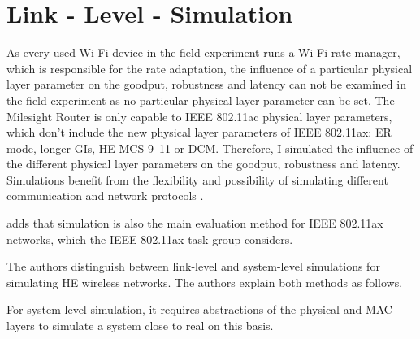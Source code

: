 \documentclass[]{nsm-thesis}
\begin{document}
\begin{comment}
\chapter{Developed architecture / System design / Implementation / ...}

\begin{itemize}
\item describe everything you yourself did (as opposed to the fundamentals chapter, which explains what you built on)
\item start with a theoretical approach
\item describe the developed system/algorithm/method from a high-level point of view
\item go ahead in presenting your developments in more detail
\item recommended length: approximately one third of the thesis.
\end{itemize}
\end{comment}


\chapter{Link - Level - Simulation}

As every used Wi-Fi device in the field experiment runs a Wi-Fi rate manager, which is responsible for the rate adaptation,
the influence of a particular physical layer parameter on the goodput, robustness and latency can not be examined in the field experiment as no particular physical layer parameter can be set.
The Milesight Router is only capable to IEEE 802.11ac physical layer parameters, which don't include the new physical layer parameters of IEEE 802.11ax:
\ac{ER} mode, longer \ac{GI}s, HE-\ac{MCS} \numrange{9}{11} or \ac{DCM}.
Therefore, I simulated the influence of the different physical layer parameters on the goodput, robustness and latency.
Simulations benefit from the flexibility and possibility of simulating different communication and network protocols \cite{kumar_simulators_2012}.


\textcite{omar_survey_2016} adds that simulation is also the main evaluation method for IEEE 802.11ax networks, which the IEEE 802.11ax task group considers.

The authors distinguish between link-level and system-level simulations for simulating \ac{HE} wireless networks.
The authors explain both methods as follows.

For system-level simulation, it requires abstractions of the physical and MAC layers to simulate a system close to
real on this basis.
\end{document}
